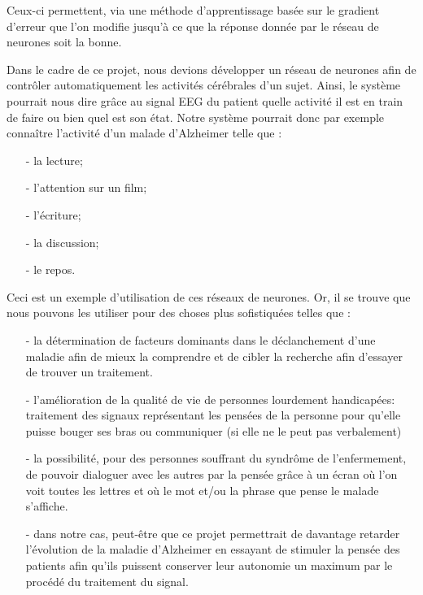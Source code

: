        Ceux-ci permettent, via une méthode d'apprentissage basée sur le gradient d'erreur que l'on modifie jusqu'à ce que la réponse donnée par le réseau de neurones soit la bonne.

	   Dans le cadre de ce projet, nous devions développer un réseau de neurones afin de contrôler automatiquement les activités cérébrales d'un sujet. Ainsi, le système pourrait nous dire grâce au signal EEG du patient quelle activité il est en train de faire ou bien quel est son état. Notre système pourrait donc par exemple connaître l'activité d'un malade d'Alzheimer telle que :
	   \begin{itemize}
	   	\item[-] la lecture;
		\item[-] l'attention sur un film;
		\item[-] l'écriture;
		\item[-] la discussion;
		\item[-] le repos.
	   \end{itemize}

	   Ceci est un exemple d'utilisation de ces réseaux de neurones. Or, il se trouve que nous pouvons les utiliser pour des choses plus sofistiquées telles que :
	   \begin{itemize}
	   \item[-]la détermination de facteurs dominants dans le déclanchement d'une maladie afin de mieux la comprendre et de cibler la recherche afin d'essayer de trouver un traitement.
	   \item[-]l'amélioration de la qualité de vie de personnes lourdement handicapées: traitement des signaux représentant les pensées de la personne pour qu'elle puisse bouger ses bras ou communiquer (si elle ne le peut pas verbalement)
	   \item[-]la possibilité, pour des personnes souffrant du syndrôme de l'enfermement, de pouvoir dialoguer avec les autres par la pensée grâce à un écran où l'on voit toutes les lettres et où le mot et/ou la phrase que pense le malade s'affiche.
	   \item[-]dans notre cas, peut-être que ce projet permettrait de davantage retarder l'évolution de la maladie d'Alzheimer en essayant de stimuler la pensée des patients afin qu'ils puissent conserver leur autonomie un maximum par le procédé du traitement du signal.
	   \end{itemize}
	
	
	
	

